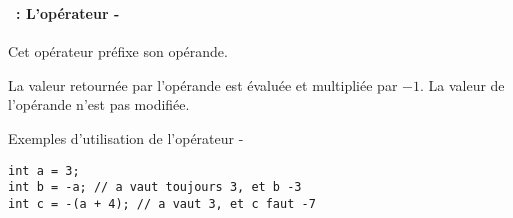 \begin{frame}[containsverbatim]
  \frametitle{\secname}
  \framesubtitle{\subsecname~: L'opérateur -} 
  
  Cet opérateur préfixe son opérande.
  \vspace{0.3cm}
  \par
  La valeur retournée par l'opérande est évaluée et multipliée par $-1$. La valeur de l'opérande n'est pas modifiée.
  \begin{exampleblock}{Exemples d'utilisation de l'opérateur -}
    \begin{verbatim}
int a = 3;
int b = -a; // a vaut toujours 3, et b -3
int c = -(a + 4); // a vaut 3, et c faut -7
    \end{verbatim}
  \end{exampleblock}
\end{frame}

